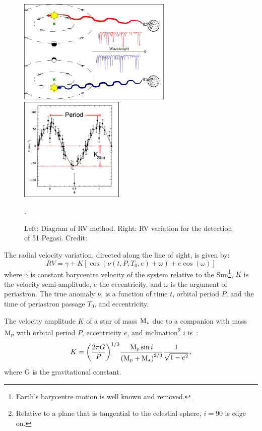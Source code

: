 \begin{figure}
    \centering
    \includegraphics[height=5cm]{./figures/introduction/RV_Diagram}
    \includegraphics[height=5cm]{./figures/introduction/PhaseFolded_51Pegb_Mayor_et_al_1995}
    \caption{Left: Diagram of {RV} method.
        Right: {RV} variation for the detection of {51 Pegasi}.
        Credit:~\citet{mayor_jupitermass_1995}}.
    \label{fig:rvdiagram-mayor}
\end{figure}

The radial velocity variation, directed along the line of sight, is given by:
\begin{equation}
\label{eqn:rv_equation_intro}
{RV} = \gamma + K [\cos{(\nu(t, P, T_0, e) + \omega)} + e\cos{(\omega)}]
\end{equation}
where $\gamma$ is constant barycentre velocity of the system relative to the Sun\footnote{Earth's barycentre motion is well known and removed.}, \(K\) is the velocity semi-amplitude, \(e\) the eccentricity, and \(\omega\) is the argument of periastron.
The true anomaly \(\nu\), is a function of time \(t\), orbital period \(P\), and the time of periastron passage \(T_0\), and eccentricity.

The velocity amplitude $K$ of a star of mass $\textrm{M}_{\star}$ due to a companion with mass $\textrm{M}_{p}$ with orbital period $P$, eccentricity $e$, and inclination\footnote{Relative to a plane that is tangential to the celestial sphere, $i=90$ is edge on.} $i$ is~\citep[e.g.][]{cumming_lick_1999}:
\begin{equation}
    K = {\left(\frac{2\pi G}{P}\right)}^{1/3} \frac{\textrm{M}_{p}{} \sin{i}}{{(\textrm{M}_{p}{} + \textrm{M}_{\star})}^{2/3}} \frac{1}{\sqrt{1-{e}^{2}}}, \label{eqn:k_amplitude}
\end{equation}
where G is the gravitational constant.

